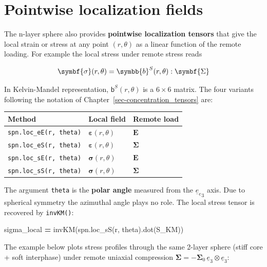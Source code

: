 \documentclass[
  a4paper,
  numbers=noendperiod,
  DIV=12]{scrreprt}
\newenvironment{Shaded}{\begin{snugshade}}{\end{snugshade}}
\newcommand{\NormalTok}[1]{#1}
\newcommand{\OperatorTok}[1]{\textcolor[rgb]{0.81,0.36,0.00}{\textbf{#1}}}
\newcounter{none} %
\newcommand{\uu}[1]{{\symbf{{#1}}}}
\newcommand{\uuuu}[1]{{\symbb{{#1}}}}
\newcommand{\uv}[1]{{\underline{{#1}}}}
\newcommand{\ve}[1]{{\uv{{e}}_{{#1}}}}
\newcommand{\eps}{{\uu{{\varepsilon}}}}
\newcommand{\E}{{\uu{{E}}}}
\newcommand{\sig}{{\uu{{\sigma}}}}
\newcommand{\Sig}{{\uu{{\Sigma}}}}
\newcommand{\mat}{\mathsf}
\begin{document}
\section{Pointwise localization fields}\label{sec-local-fields}

The n-layer sphere also provides \textbf{pointwise localization tensors}
that give the local strain or stress at any point \((r, \theta)\) as a
linear function of the remote loading. For example the local stress
under remote stress reads

\[
\sig(r, \theta) = \uuuu{b}^S(r, \theta) : \Sig
\]

In Kelvin-Mandel representation, \(\mat{b}^S(r, \theta)\) is a
\(6\times6\) matrix. The four variants following the notation of
Chapter~\ref{sec-concentration_tensors} are:

{\def\LTcaptype{none} %
\begin{longtable}[]{@{}lll@{}}
\toprule\noalign{}
Method & Local field & Remote load \\
\midrule\noalign{}
\endhead
\bottomrule\noalign{}
\endlastfoot
\texttt{spn.loc\_eE(r,\ theta)} & \(\eps(r,\theta)\) & \(\E\) \\
\texttt{spn.loc\_eS(r,\ theta)} & \(\eps(r,\theta)\) & \(\Sig\) \\
\texttt{spn.loc\_sE(r,\ theta)} & \(\sig(r,\theta)\) & \(\E\) \\
\texttt{spn.loc\_sS(r,\ theta)} & \(\sig(r,\theta)\) & \(\Sig\) \\
\end{longtable}
}

The argument \texttt{theta} is the \textbf{polar angle} measured from
the \(\ve{e}_3\) axis. Due to spherical symmetry the azimuthal angle
plays no role. The local stress tensor is recovered by \texttt{invKM()}:

\begin{Shaded}
\begin{Highlighting}[]
\NormalTok{sigma\_local }\OperatorTok{=}\NormalTok{ invKM(spn.loc\_sS(r, theta).dot(S\_KM))}
\end{Highlighting}
\end{Shaded}

The example below plots stress profiles through the same 2-layer sphere
(stiff core + soft interphase) under remote uniaxial compression
\(\Sig = -\Sig_0\,\ve{3}\otimes\ve{3}\):
\end{document}
